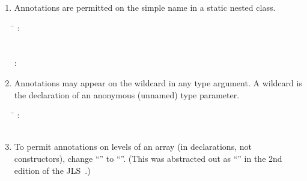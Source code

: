 \documentclass[10pt]{article}
\begin{document}
\begin{enumerate}
\item
Annotations are permitted on the simple name in a static nested class.

\begin{tabbing}
\qquad \= \kill
{}: \\
\qquad {} \\
 \\
: \\
\qquad            {}  
\end{tabbing}

\item
Annotations may appear on the wildcard in any type argument.
A wildcard is the declaration of an anonymous (unnamed) type parameter.

\begin{tabbing}
\qquad \= \kill
{}: \\
\qquad            {} \ 
\end{tabbing}


% 


\item
To permit annotations on levels of an array (in declarations, not
constructors), change ``\multi{\term{[]}}''  to
``''.
(This was abstracted out as
``'' in the 2nd edition of the JLS~\cite{GoslingJSB2000}.)


\end{enumerate}
\end{document}

